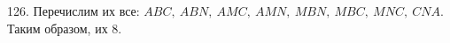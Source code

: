 126. Перечислим их все: $ABC,\ ABN,\ AMC,\ AMN,\ MBN,\ MBC,\ MNC,\ CNA.$ Таким образом, их 8.
\begin{center}
\begin{figure}[ht!]
\end{figure}
\end{center}
